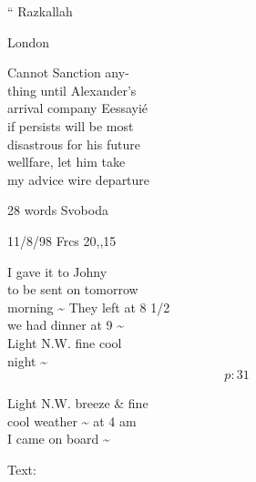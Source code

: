 \documentclass{report}
\begin{document}
	\par{
 	“ Razkallah\ \\
	}

	\par{
 	London\ \\
	}

	\par{
 	Cannot Sanction any-\ \\thing until Alexander's\ \\arrival company Eessayié\ \\if persists will be most\ \\disastrous for his future\ \\wellfare, let him take\ \\my advice wire departure\ \\
	}

	\par{
 	28 words Svoboda\ \\
	}

	\par{
 	11/8/98 Frcs 20,,15\ \\
	}

	\par{
 	I gave it to Johny\ \\to be sent on tomorrow\ \\morning \~{} They left at 8 1/2\ \\we had dinner at 9 \~{}\ \\Light N.W. fine cool\ \\night \~{}\ \\
  \[p: 31 \]

	}







	\par{
 	Light N.W. breeze \& fine\ \\cool weather \~{} at 4 am\ \\I came on board \~{}\ \\
	}

	\par{
 	Text:\ \\
	}
\end{document}
